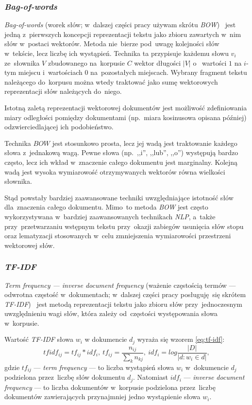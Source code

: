 \documentclass[pl]{minipw} %
\begin{document}
\subsubsection{\textit{Bag-of-words}}
\textit{Bag-of-words} (worek słów; w~dalszej części pracy używam skrótu \textit{BOW})~\cite{bow} jest jedną z~pierwszych koncepcji reprezentacji tekstu jako zbioru zawartych w~nim słów w~postaci wektorów. Metoda nie~bierze pod~uwagę kolejności słów w~tekście, lecz liczbę ich wystąpień. Technika ta przypisuje każdemu słowu $v_i$ ze~słownika $V$ zbudowanego na~korpusie $C$ wektor długości $|V|$ o~ wartości $1$ na $i$-tym miejscu i~wartościach $0$ na~pozostałych miejscach. Wybrany fragment tekstu należącego do~korpusu można wtedy traktować jako sumę wektorowych reprezentacji słów należących do~niego.

Istotną zaletą reprezentacji wektorowej dokumentów jest możliwość zdefiniowania miary odległości pomiędzy dokumentami (np.~miara kosinusowa opisana później) odzwierciedlającej ich podobieństwo.

Technika $BOW$ jest stosunkowo prosta, lecz jej wadą jest traktowanie każdego słowa z~jednakową wagą. Pewne słowa (np.~,,i'', ,,lub'', ,,o'') występują bardzo często, lecz ich wkład w~znaczenie całego dokumentu jest marginalny. Kolejną wadą jest wysoka wymiarowość otrzymywanych wektorów równa wielkości słownika.

Stąd powstały bardziej zaawansowane techniki uwzględniające istotność słów dla~znaczenia całego dokumentu. Mimo~to metoda \textit{BOW} jest często wykorzystywana w~bardziej zaawansowanych technikach \textit{NLP}, a~także przy~przetwarzaniu wstępnym tekstu przy~okazji zabiegów usunięcia słów stopu oraz lematyzacji stosowanych w~celu zmniejszenia wymiarowości przestrzeni wektorowej słów.
\subsubsection{\textit{TF-IDF}}

\textit{Term frequency --- inverse document frequency} (ważenie częstością termów --- odwrotna częstość w~dokumentach; w~dalszej części pracy posługuję~się skrótem \textit{TF-IDF})~\cite{tf_idf} jest metodą reprezentacji tekstu jako zbioru słów przy~jednoczesnym uwzględnieniu wagi słów, która zależy od~częstości występowania słowa w~korpusie.

Wartość \textit{TF-IDF} słowa $w_i$ w dokumencie $d_j$ wyraża się wzorem \ref{eq:tf-idf}: 
\begin{equation}
\label{eq:tf-idf}
tfidf_{ij} = tf_{ij} * idf_i,\ tf_{ij} = \frac{n_{ij}}{\sum\limits_{k}n_{kj}},\ idf_i = log\frac{|D|}{|{d:w_i \in d}|},
\end{equation}
gdzie $tf_{ij}$ --- \textit{term frequency} --- to liczba wystąpień słowa $w_i$ w~dokumencie $d_j$ podzielona przez~liczbę słów dokumentu $d_j$. Natomiast $idf_i$ --- \textit{inverse document frequency} --- to liczba dokumentów w~korpusie podzielona przez~liczbę dokumentów zawierających przynajmniej jedno wystąpienie słowa $w_i$.
\end{document}
